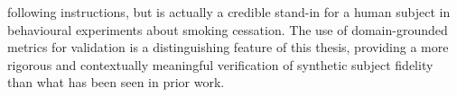 following instructions, but is actually a credible stand-in for a human subject in behavioural experiments about smoking cessation. The use of domain-grounded metrics for validation is a distinguishing feature of this thesis, providing a more rigorous and contextually meaningful verification of synthetic subject fidelity than what has been seen in prior work.
